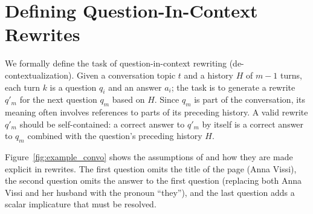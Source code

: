 \section{Defining Question-In-Context Rewrites  \label{sec:pp_task}}



We formally define the task of question-in-context rewriting
(de-contextualization).
Given a conversation topic $t$ and a history $H$ of $m-1$ turns, 
each turn $k$ is a question $q_i$ and an answer $a_i$;
the task is to generate a rewrite $q'_m$ for the next question $q_m$
based on $H$.
Since $q_m$ is part of the conversation, its meaning often involves
references to parts of its preceding history.
A valid rewrite $q'_m$ should be self-contained: a correct answer
to $q'_m$ by itself is a correct answer to $q_m$ combined with the
question's preceding history $H$.

Figure~\ref{fig:example_convo} shows the assumptions of  and
how they are made explicit in rewrites.
The first question omits the title of the page (Anna Vissi), the
second question omits the answer to the first question (replacing both
Anna Vissi and her husband with the pronoun ``they''), and the last
question adds a scalar implicature that must be resolved.



